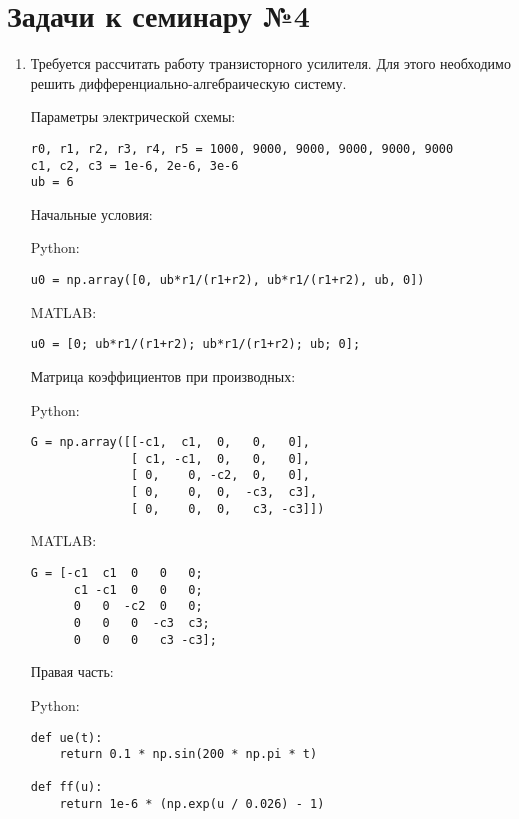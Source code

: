 \documentclass{article}
\begin{document}
\section*{Задачи к семинару №4}
\begin{enumerate}
\item Требуется рассчитать работу транзисторного усилителя. Для этого необходимо решить дифференциально-алгебраическую систему.

Параметры электрической схемы:
\begin{verbatim}
r0, r1, r2, r3, r4, r5 = 1000, 9000, 9000, 9000, 9000, 9000
c1, c2, c3 = 1e-6, 2e-6, 3e-6
ub = 6
\end{verbatim}
Начальные условия:

Python:
\begin{verbatim}
u0 = np.array([0, ub*r1/(r1+r2), ub*r1/(r1+r2), ub, 0])
\end{verbatim}
MATLAB:
\begin{matlablisting}
	\begin{verbatim}
u0 = [0; ub*r1/(r1+r2); ub*r1/(r1+r2); ub; 0];
	\end{verbatim}
\end{matlablisting}
Матрица коэффициентов при производных:  

Python:
\begin{verbatim}
G = np.array([[-c1,  c1,  0,   0,   0],
              [ c1, -c1,  0,   0,   0],
              [ 0,    0, -c2,  0,   0],
              [ 0,    0,  0,  -c3,  c3],
              [ 0,    0,  0,   c3, -c3]])
\end{verbatim}
MATLAB:
\begin{matlablisting}
	\begin{verbatim}
G = [-c1  c1  0   0   0;
      c1 -c1  0   0   0;
      0   0  -c2  0   0;
      0   0   0  -c3  c3;
      0   0   0   c3 -c3];
	\end{verbatim}
\end{matlablisting}
\newpage
Правая часть:

Python:
\begin{verbatim}
def ue(t):
    return 0.1 * np.sin(200 * np.pi * t)

def ff(u):
    return 1e-6 * (np.exp(u / 0.026) - 1)


\end{verbatim}
\end{enumerate}
\end{document}
